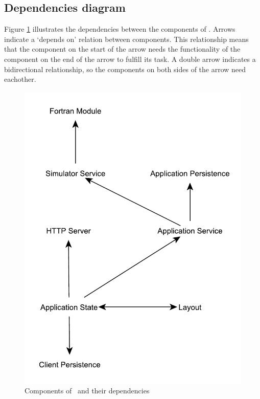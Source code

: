 \subsection{Dependencies diagram}
\label{subsec:depdiag}

Figure \ref{fig:compdependencies} illustrates the dependencies between the components of \projectname{}. Arrows indicate a `depends on' relation between components. This relationship means that the component on the start of the arrow needs the functionality of the component on the end of the arrow to fulfill its task. A double arrow indicates a bidirectional relationship, so the components on both sides of the arrow need eachother.

\noindent
\begin{figure}[h!b]
	\centering
	\includegraphics[width=\textwidth]{ComponentDependencies}
	\caption{Components of \projectname\ and their dependencies}
	\label{fig:compdependencies}
\end{figure}
